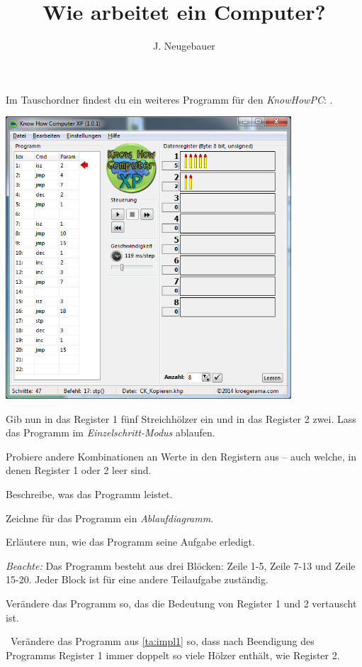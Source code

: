 \documentclass[10pt, a4paper]{scrartcl}
\author{J. Neugebauer}
\title{Wie arbeitet ein Computer?}
\date{\Heute}
\begin{document}
\ReiheTitel

\begin{aufgabe}[symbol=\symLaptop]
	Im Tauschordner findest du ein weiteres Programm für den \emph{KnowHowPC}: .
	
	\begin{center}
		\includegraphics[width=0.8\textwidth]{9Diff-AB.3-Abb-1}
	\end{center}
	
	\begin{teilaufgaben}
		\teilaufgabe Gib nun in das Register 1 fünf Streichhölzer ein und in das Register 2 zwei. Lass das Programm im \emph{Einzelschritt-Modus} ablaufen.
		
		\teilaufgabe Probiere andere Kombinationen an Werte in den Registern aus – auch welche, in denen Register 1 oder 2 leer sind.
		
		\teilaufgabe Beschreibe, was das Programm leistet.
		
		\teilaufgabe Zeichne für das Programm ein \emph{Ablaufdiagramm}.
		
		\teilaufgabe Erläutere nun, wie das Programm seine Aufgabe erledigt.
		
		\emph{Beachte:} Das Programm besteht aus drei Blöcken: Zeile 1-5, Zeile 7-13 und Zeile 15-20. Jeder Block ist für eine andere Teilaufgabe zuständig.
		
		\teilaufgabe\label{ta:impl1} Verändere das Programm so, das die Bedeutung von Register 1 und 2 vertauscht ist.
		
		\teilaufgabe\symStern\ Verändere das Programm aus \ref{ta:impl1} so, dass nach Beendigung des Programms Register 1 immer doppelt so viele Hölzer enthält, wie Register 2.
	\end{teilaufgaben}
\end{aufgabe}
\end{document}
